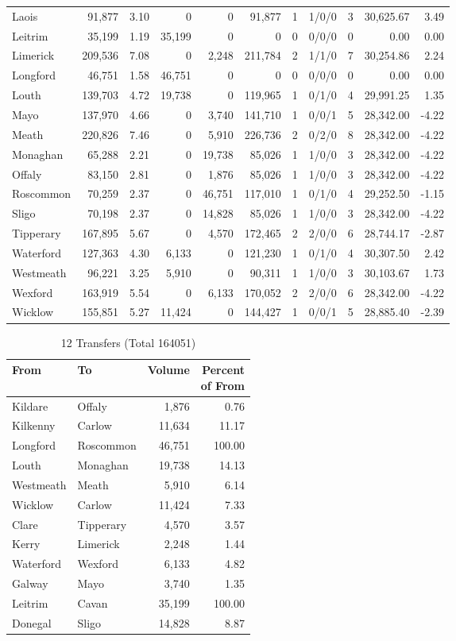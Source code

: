 \documentclass[a4paper]{article}
\begin{document}
\begin{longtable}{lrrrrrrlrrr}
Laois&91,877& 3.10&0&0&91,877&1&1/0/0&3&30,625.67& 3.49\\ 
Leitrim&35,199& 1.19&35,199&0&0&0&0/0/0&0& 0.00& 0.00\\ 
Limerick&209,536& 7.08&0&2,248&211,784&2&1/1/0&7&30,254.86& 2.24\\ 
Longford&46,751& 1.58&46,751&0&0&0&0/0/0&0& 0.00& 0.00\\ 
Louth&139,703& 4.72&19,738&0&119,965&1&0/1/0&4&29,991.25& 1.35\\ 
Mayo&137,970& 4.66&0&3,740&141,710&1&0/0/1&5&28,342.00&-4.22\\ 
Meath&220,826& 7.46&0&5,910&226,736&2&0/2/0&8&28,342.00&-4.22\\ 
Monaghan&65,288& 2.21&0&19,738&85,026&1&1/0/0&3&28,342.00&-4.22\\ 
Offaly&83,150& 2.81&0&1,876&85,026&1&1/0/0&3&28,342.00&-4.22\\ 
Roscommon&70,259& 2.37&0&46,751&117,010&1&0/1/0&4&29,252.50&-1.15\\ 
Sligo&70,198& 2.37&0&14,828&85,026&1&1/0/0&3&28,342.00&-4.22\\ 
Tipperary&167,895& 5.67&0&4,570&172,465&2&2/0/0&6&28,744.17&-2.87\\ 
Waterford&127,363& 4.30&6,133&0&121,230&1&0/1/0&4&30,307.50& 2.42\\ 
Westmeath&96,221& 3.25&5,910&0&90,311&1&1/0/0&3&30,103.67& 1.73\\ 
Wexford&163,919& 5.54&0&6,133&170,052&2&2/0/0&6&28,342.00&-4.22\\ 
Wicklow&155,851& 5.27&11,424&0&144,427&1&0/0/1&5&28,885.40&-2.39\\ 
\end{longtable}

\begin{table}[htbp]
\caption{12 Transfers (Total 164051)}
\centering
\begin{tabular}{llrr} \toprule
From &To &Volume &\shortstack{Percent\\of From} \\ \midrule
Kildare&Offaly&1,876& 0.76\\ 
Kilkenny&Carlow&11,634&11.17\\ 
Longford&Roscommon&46,751&100.00\\ 
Louth&Monaghan&19,738&14.13\\ 
Westmeath&Meath&5,910& 6.14\\ 
Wicklow&Carlow&11,424& 7.33\\ 
Clare&Tipperary&4,570& 3.57\\ 
Kerry&Limerick&2,248& 1.44\\ 
Waterford&Wexford&6,133& 4.82\\ 
Galway&Mayo&3,740& 1.35\\ 
Leitrim&Cavan&35,199&100.00\\ 
Donegal&Sligo&14,828& 8.87\\ 
\bottomrule
\end{tabular}
\end{table}
\end{document}
